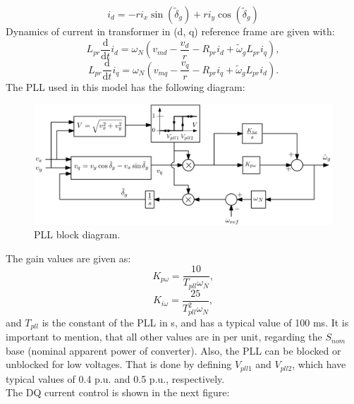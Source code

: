 \documentclass{report}
\begin{document}
\begin{equation}
    i_d = -ri_x\sin(\tilde{\delta}_g) + ri_y\cos(\tilde{\delta}_g)
\end{equation}
Dynamics of current in transformer in (d, q) reference frame are given with:
\begin{equation}
    L_{pr}\frac{\text{d}}{\text{d}t}i_d = \omega_N (v_{md} - \frac{v_d}{r} - R_{pr}i_d + \tilde{\omega}_gL_{pr}i_q),
\end{equation}
\begin{equation}
    L_{pr}\frac{\text{d}}{\text{d}t}i_q = \omega_N (v_{mq} - \frac{v_q}{r} - R_{pr}i_q + \tilde{\omega}_gL_{pr}i_d).
\end{equation}
The PLL used in this model has the following diagram:
\begin{figure}[h]
    \centering
    \includegraphics[scale = 0.3]{Figure_converter/PLL.png}
    \caption{PLL block diagram.}
    \label{fig:PLL}
\end{figure}
The gain values are given as:
\begin{equation}
    K_{p\omega} = \frac{10}{T_{pll}\omega_N},
\end{equation}
\begin{equation}
    K_{i\omega} = \frac{25}{T_{pll}^2\omega_N},
\end{equation}
and $T_{pll}$ is the constant of the PLL in s, and has a typical value of 100 ms. It is important to mention, that all other values are in per unit, regarding the $S_{nom}$ base (nominal apparent power of converter). Also, the PLL can be blocked or unblocked for low voltages. That is done by defining $V_{pll1}$ and $V_{pll2}$, which have typical values of 0.4 p.u. and 0.5 p.u., respectively.
\\
The DQ current control is shown in the next figure:
\end{document}

